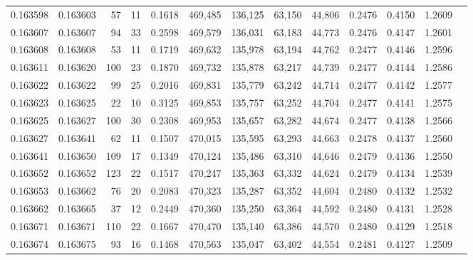 \begin{tabular}{rrrrrrrrrrrrr}
0.163598 & 0.163603 &    57 &  11 &                                     0.1618 & 469,485 & 136,125 &  63,150 &  44,806 & 0.2476 & 0.4150 & 1.2609 \\
0.163607 & 0.163607 &    94 &  33 &                                     0.2598 & 469,579 & 136,031 &  63,183 &  44,773 & 0.2476 & 0.4147 & 1.2601 \\
0.163608 & 0.163608 &    53 &  11 &                                     0.1719 & 469,632 & 135,978 &  63,194 &  44,762 & 0.2477 & 0.4146 & 1.2596 \\
0.163611 & 0.163620 &   100 &  23 &                                     0.1870 & 469,732 & 135,878 &  63,217 &  44,739 & 0.2477 & 0.4144 & 1.2586 \\
0.163622 & 0.163622 &    99 &  25 &                                     0.2016 & 469,831 & 135,779 &  63,242 &  44,714 & 0.2477 & 0.4142 & 1.2577 \\
0.163623 & 0.163625 &    22 &  10 &                                     0.3125 & 469,853 & 135,757 &  63,252 &  44,704 & 0.2477 & 0.4141 & 1.2575 \\
0.163625 & 0.163627 &   100 &  30 &                                     0.2308 & 469,953 & 135,657 &  63,282 &  44,674 & 0.2477 & 0.4138 & 1.2566 \\
0.163627 & 0.163641 &    62 &  11 &                                     0.1507 & 470,015 & 135,595 &  63,293 &  44,663 & 0.2478 & 0.4137 & 1.2560 \\
0.163641 & 0.163650 &   109 &  17 &                                     0.1349 & 470,124 & 135,486 &  63,310 &  44,646 & 0.2479 & 0.4136 & 1.2550 \\
0.163652 & 0.163652 &   123 &  22 &                                     0.1517 & 470,247 & 135,363 &  63,332 &  44,624 & 0.2479 & 0.4134 & 1.2539 \\
0.163653 & 0.163662 &    76 &  20 &                                     0.2083 & 470,323 & 135,287 &  63,352 &  44,604 & 0.2480 & 0.4132 & 1.2532 \\
0.163662 & 0.163665 &    37 &  12 &                                     0.2449 & 470,360 & 135,250 &  63,364 &  44,592 & 0.2480 & 0.4131 & 1.2528 \\
0.163671 & 0.163671 &   110 &  22 &                                     0.1667 & 470,470 & 135,140 &  63,386 &  44,570 & 0.2480 & 0.4129 & 1.2518 \\
0.163674 & 0.163675 &    93 &  16 &                                     0.1468 & 470,563 & 135,047 &  63,402 &  44,554 & 0.2481 & 0.4127 & 1.2509 \\

\end{tabular}
